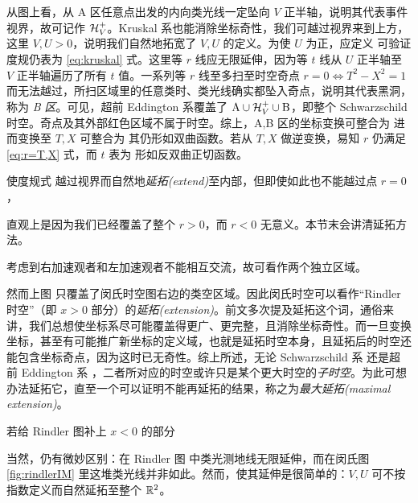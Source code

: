 从图上看，从 A 区任意点出发的内向类光线一定坠向 $V$ 正半轴，说明其代表事件视界，故可记作 $\mathcal{H}_V^+$。Kruskal 系也能消除坐标奇性，我们可越过视界来到上方，这里 $V,U>0$，说明我们自然地拓宽了 $V,U$ 的定义。为使 $U$ 为正，应定义
可验证度规仍表为 \eqref{eq:kruskal} 式。这里等 $r$ 线应无限延伸，因为等 $t$ 线从 $U$ 正半轴至 $V$ 正半轴遍历了所有 $t$ 值。一系列等 $r$ 线至多扫至时空奇点 $r=0\Leftrightarrow T^2-X^2=1$ 而无法越过，所扫区域里的任意类时、类光线确实都坠入奇点，说明其代表黑洞，称为 \textit{B 区}。可见，超前 Eddington 系覆盖了 $\mathrm{A}\cup\mathcal{H}_V^+\cup\mathrm{B}$，即整个 Schwarzschild 时空。奇点及其外部红色区域不属于时空。综上，A,B 区的坐标变换可整合为
进而变换至 $T,X$ 可整合为
其仍形如双曲函数。若从 $T,X$ 做逆变换，易知 $r$ 仍满足 \eqref{eq:r=T,X} 式，而 $t$ 表为
形如反双曲正切函数。




使度规式  越过视界而自然地\textit{延拓(extend)}至内部，但即使如此也不能越过点 $r=0$，

直观上是因为我们已经覆盖了整个 $r>0$，而 $r<0$ 无意义。本节末会讲清延拓方法。




考虑到右加速观者和左加速观者不能相互交流，故可看作两个独立区域。



然而上图   只覆盖了闵氏时空图右边的类空区域。因此闵氏时空可以看作“Rindler 时空”（即 $x>0$ 部分）的\textit{延拓(extension)}。前文多次提及延拓这个词，通俗来讲，我们总想使坐标系尽可能覆盖得更广、更完整，且消除坐标奇性。而一旦变换坐标，甚至有可能推广新坐标的定义域，也就是延拓时空本身，且延拓后的时空还能包含坐标奇点，因为这时已无奇性。综上所述，无论 Schwarzschild 系   还是超前 Eddington 系 ，二者所对应的时空或许只是某个更大时空的\textit{子时空}。为此可想办法延拓它，直至一个可以证明不能再延拓的结果，称之为\textit{最大延拓(maximal extension)}。



若给 Rindler 图补上 $x<0$ 的部分




当然，仍有微妙区别：在 Rindler 图   中类光测地线无限延伸，而在闵氏图 \ref{fig:rindlerIM} 里这堆类光线并非如此。然而，使其延伸是很简单的：$V,U$ 可不按指数定义而自然延拓至整个 $\mathbb{R}^2$。


